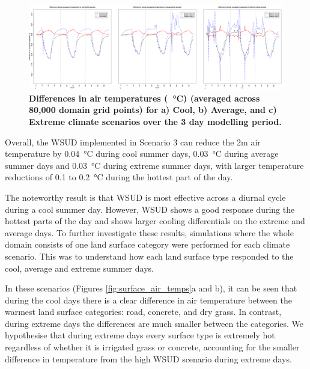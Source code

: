 \documentclass[final,3p,times,authoryear]{elsarticle}
\begin{document}
						
								



\begin{figure}[!htbp]
\centering   
\includegraphics[scale=0.25]{images/temperatures/SunburyAll}
\caption{\bf Differences in air temperatures (\SI{}{\degreeCelsius}) (averaged across 80,000 domain grid points) for a) Cool, b) Average, and c) Extreme climate scenarios over the 3 day modelling period. }    
 \label{fig:diff_air_temp} 
\end{figure} 


Overall, the WSUD implemented in Scenario 3 can reduce the 2m air temperature by 0.04\SI{}{\degreeCelsius} during cool summer days, 0.03\SI{}{\degreeCelsius} during average summer days and 0.03\SI{}{\degreeCelsius} during extreme summer days, with larger temperature reductions of 0.1 to 0.2\SI{}{\degreeCelsius} during the hottest part of the day.




The noteworthy result is that WSUD is most effective across a diurnal cycle during a cool summer day. However, WSUD shows a good response during the hottest parts of the day and shows larger cooling differentials on the extreme and average days. To further investigate these results, simulations where the whole domain consists of one land surface category were performed for each climate scenario. This was to understand how each land surface type responded to the cool, average and extreme summer days.

In these scenarios (Figures \ref{fig:surface_air_temps}a and b), it can be seen that during the cool days there is a clear difference in air temperature between the warmest land surface categories: road, concrete, and dry grass. In contrast, during extreme days the differences are much smaller between the categories. We hypothesise that during extreme days every surface type is extremely hot regardless of whether it is irrigated grass or concrete, accounting for the smaller difference in temperature from the high WSUD scenario during extreme days.
\end{document}
